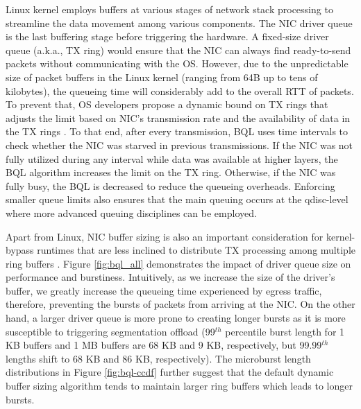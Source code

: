 Linux kernel employs buffers at various stages of network stack processing to streamline the data movement among various components. The NIC driver queue is the last buffering stage before triggering the hardware. A fixed-size driver queue (a.k.a., TX ring) would ensure that the NIC can always find ready-to-send packets without communicating with the OS. However, due to the unpredictable size of packet buffers in the Linux kernel (ranging from 64B up to tens of kilobytes), the queueing time will considerably add to the overall RTT of packets. To prevent that, OS developers propose a dynamic bound on TX rings that adjusts the limit based on NIC's transmission rate and the availability of data in the TX rings \cite{bql}. To that end, after every transmission, BQL uses time intervals to check whether the NIC was starved in previous transmissions. If the NIC was not fully utilized during any interval while data was available at higher layers, the BQL algorithm increases the limit on the TX ring. Otherwise, if the NIC was fully busy, the BQL is decreased to reduce the queueing overheads. Enforcing smaller queue limits also ensures that the main queuing occurs at the qdisc-level where more advanced queuing disciplines can be employed.

Apart from Linux, NIC buffer sizing is also an important consideration for kernel-bypass runtimes that are less inclined to distribute TX processing among multiple ring buffers \cite{shenango,tas}. Figure \ref{fig:bql_all} demonstrates the impact of driver queue size on performance and burstiness. Intuitively, as we increase the size of the driver's buffer, we greatly increase the queueing time experienced by egress traffic, therefore, preventing the bursts of packets from arriving at the NIC. On the other hand, a larger driver queue is more prone to creating longer bursts as it is more susceptible to triggering segmentation offload (99$^{th}$ percentile burst length for 1 KB buffers and 1 MB buffers are 68 KB and 9 KB, respectively, but 99.99$^{th}$ lengths shift to 68 KB and 86 KB, respectively). The microburst length distributions in Figure \ref{fig:bql-ccdf} further suggest that the default dynamic buffer sizing algorithm tends to maintain larger ring buffers which leads to longer bursts.


